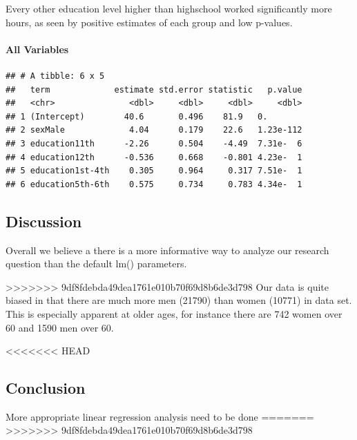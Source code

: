 \documentclass[]{article}
\let\oldparagraph\paragraph
\renewcommand{\paragraph}[1]{\oldparagraph{#1}\mbox{}}
\begin{document}
Every other education level higher than highschool worked significantly
more hours, as seen by positive estimates of each group and low
p-values.

\hypertarget{all-variables}{%
\paragraph{All Variables}\label{all-variables}}

\begin{verbatim}
## # A tibble: 6 x 5
##   term             estimate std.error statistic   p.value
##   <chr>               <dbl>     <dbl>     <dbl>     <dbl>
## 1 (Intercept)        40.6       0.496    81.9   0.       
## 2 sexMale             4.04      0.179    22.6   1.23e-112
## 3 education11th      -2.26      0.504    -4.49  7.31e-  6
## 4 education12th      -0.536     0.668    -0.801 4.23e-  1
## 5 education1st-4th    0.305     0.964     0.317 7.51e-  1
## 6 education5th-6th    0.575     0.734     0.783 4.34e-  1
\end{verbatim}

\hypertarget{discussion}{%
\subsection{Discussion}\label{discussion}}

Overall we believe a there is a more informative way to analyze our
research question than the default lm() parameters.

>>>>>>> 9df8fdebda49dea1761e010b70f69d8b6de3d798
Our data is quite biased in that there are much more men (21790) than
women (10771) in data set. This is especially apparent at older ages,
for instance there are 742 women over 60 and 1590 men over 60.

<<<<<<< HEAD
\hypertarget{conclusion}{%
\subsection{Conclusion}\label{conclusion}}

More appropriate linear regression analysis need to be done
=======
>>>>>>> 9df8fdebda49dea1761e010b70f69d8b6de3d798
\end{document}
